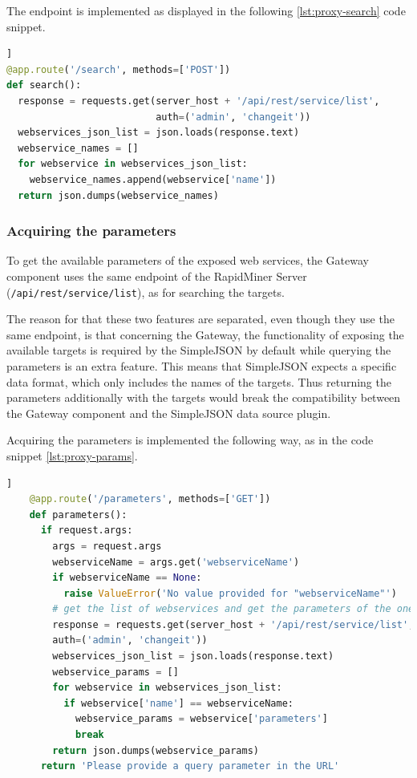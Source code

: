 The endpoint is implemented as displayed in the following \ref{lst:proxy-search} code snippet. 

\begin{minipage}{\linewidth}
\begin{lstlisting}[language=Python, caption={Get the names of the web services}, label={lst:proxy-search}]]
@app.route('/search', methods=['POST'])
def search():
  response = requests.get(server_host + '/api/rest/service/list',
                          auth=('admin', 'changeit'))
  webservices_json_list = json.loads(response.text)
  webservice_names = []
  for webservice in webservices_json_list:
    webservice_names.append(webservice['name'])
  return json.dumps(webservice_names)
\end{lstlisting}
\end{minipage}
\subsubsection{Acquiring the parameters}

To get the available parameters of the exposed web services, the Gateway component uses the same endpoint of the RapidMiner Server (\texttt{/api/rest/service/list}), as for searching the targets.

The reason for that these two features are separated, even though they use the same endpoint, is that concerning the Gateway, the functionality of exposing the available targets is required by the SimpleJSON by default while querying the parameters is an extra feature. This means that SimpleJSON expects a specific data format, which only includes the names of the targets. Thus returning the parameters additionally with the targets would break the compatibility between the Gateway component and the SimpleJSON data source plugin.

Acquiring the parameters is implemented the following way, as in the code snippet \ref{lst:proxy-params}.

\begin{minipage}{\linewidth}
	\begin{lstlisting}[language=Python, caption={Get the parameters for a given web service}, label={lst:proxy-params}]]
	@app.route('/parameters', methods=['GET'])
	def parameters():
	  if request.args:
	    args = request.args
	    webserviceName = args.get('webserviceName')
	    if webserviceName == None:
	      raise ValueError('No value provided for "webserviceName"')
	    # get the list of webservices and get the parameters of the one with the name provided in the query
	    response = requests.get(server_host + '/api/rest/service/list',
	    auth=('admin', 'changeit'))
	    webservices_json_list = json.loads(response.text)
	    webservice_params = []
	    for webservice in webservices_json_list:
	      if webservice['name'] == webserviceName:
	        webservice_params = webservice['parameters']
	        break
	    return json.dumps(webservice_params)
	  return 'Please provide a query parameter in the URL'
	\end{lstlisting}
\end{minipage}

